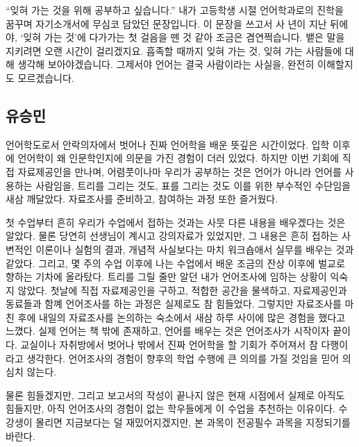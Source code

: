“잊혀 가는 것을 위해 공부하고 싶습니다.” 내가 고등학생 시절 언어학과로의 진학을 꿈꾸며 자기소개서에 무심코 담았던 문장입니다. 이 문장을 쓰고서 사 년이 지난 뒤에야, ‘잊혀 가는 것’에 다가가는 첫 걸음을 뗀 것 같아 조금은 겸연쩍습니다. 뱉은 말을 지키려면 오랜 시간이 걸리겠지요. 흡족할 때까지 잊혀 가는 것, 잊혀 가는 사람들에 대해 생각해 보아야겠습니다. 그제서야 언어는 결국 사람이라는 사실을, 완전히 이해할지도 모르겠습니다.

\subsection{유승민}
언어학도로서 안락의자에서 벗어나 진짜 언어학을 배운 뜻깊은 시간이었다. 입학 이후에 언어학이 왜 인문학인지에 의문을 가진 경험이 더러 있었다. 하지만 이번 기회에 직접 자료제공인을 만나며, 어렴풋이나마 우리가 공부하는 것은 언어가 아니라 언어를 사용하는 사람임을, 트리를 그리는 것도, 표를 그리는 것도 이를 위한 부수적인 수단임을 새삼 깨달았다. 자료조사를 준비하고, 참여하는 과정 또한 즐거웠다.

첫 수업부터 흔히 우리가 수업에서 접하는 것과는 사뭇 다른 내용을 배우겠다는 것은 알았다. 물론 당연히 선생님이 계시고 강의자료가 있었지만, 그 내용은 흔히 접하는 사변적인 이론이나 실험의 결과, 개념적 사실보다는 마치 워크숍애서 실무를 배우는 것과 같았다. 그리고, 몇 주의 수업 이후에 나는 수업에서 배운 조금의 잔상 이후에 벌교로 향하는 기차에 올라탔다. 트리를 그릴 줄만 알던 내가 언어조사에 임하는 상황이 익숙지 않았다. 첫날에 직접 자료제공인을 구하고, 적합한 공간을 물색하고, 자료제공인과 동료들과 함꼐 언어조사를 하는 과정은 실제로도 참 힘들었다. 그렇지만 자료조사를 마친 후에 내일의 자료조사를 논의하는 숙소에서 새삼 하루 사이에 많은 경험을 했다고 느꼈다. 실제 언어는 책 밖에 존재하고, 언어를 배우는 것은 언어조사가 시작이자 끝이다. 교실이나 자취방에서 벗어나 밖에서 진짜 언어학을 할 기회가 주어져서 참 다행이라고 생각한다. 언어조사의 경험이 향후의 학업 수행에 큰 의의를 가질 것임을 믿어 의심치 않는다.

물론 힘들겠지만, 그리고 보고서의 작성이 끝나지 않은 현재 시점에서 실제로 아직도 힘들지만, 아직 언어조사의 경험이 없는 학우들에게 이 수업을 추천하는 이유이다. 수강생이 몰리면 지금보다는 덜 재밌어지겠지만, 본 과목이 전공필수 과목을 지정되기를 바란다.


